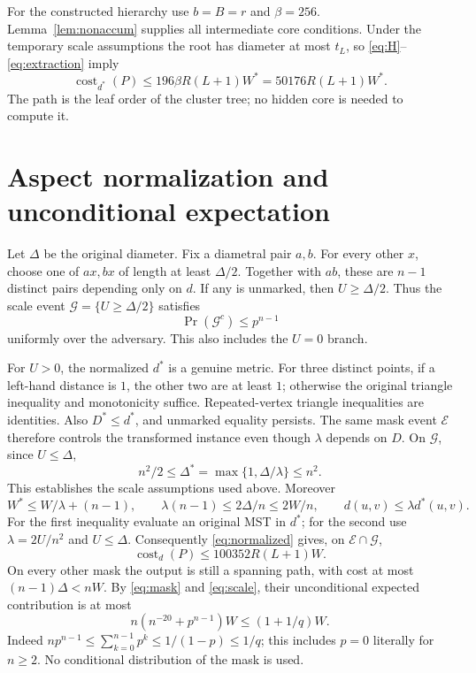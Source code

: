 \documentclass[acmsmall,11pt,nonacm]{acmart}
\theoremstyle{definition}
\newcommand{\cost}{\operatorname{cost}}
\newcommand{\calE}{\mathcal E}
\newcommand{\calG}{\mathcal G}
\begin{document}
For the constructed hierarchy use $b=B=r$ and $\beta=256$.
Lemma~\ref{lem:nonaccum} supplies all intermediate core conditions.
Under the temporary scale assumptions the root has diameter at most
$t_L$, so \eqref{eq:H}--\eqref{eq:extraction} imply
\begin{equation}\label{eq:normalized}
 \cost_{d^*}(P)\leq196\beta R(L+1)W^*
                  =50176R(L+1)W^*.
\end{equation}
The path is the leaf order of the cluster tree; no hidden core is needed
to compute it.

\section{Aspect normalization and unconditional expectation}\label{sec:expectation}

Let $\Delta$ be the original diameter. Fix a diametral pair $a,b$.
For every other $x$, choose one of $ax,bx$ of length at least $\Delta/2$.
Together with $ab$, these are $n-1$ distinct pairs depending only on $d$.
If any is unmarked, then $U\geq\Delta/2$. Thus the scale event
$\calG=\{U\geq\Delta/2\}$ satisfies
\begin{equation}\label{eq:scale}
 \Pr(\calG^c)\leq p^{n-1}
\end{equation}
uniformly over the adversary. This also includes the $U=0$ branch.

For $U>0$, the normalized $d^*$ is a genuine metric. For three distinct
points, if a left-hand distance is $1$, the other two are at least $1$;
otherwise the original triangle inequality and monotonicity suffice.
Repeated-vertex triangle inequalities are identities. Also $D^*\leq d^*$,
and unmarked equality persists. The same mask event $\calE$ therefore
controls the transformed instance even though $\lambda$ depends on $D$.
On $\calG$, since $U\leq\Delta$,
\[
 n^2/2\leq\Delta^*=\max\{1,\Delta/\lambda\}\leq n^2.
\]
This establishes the scale assumptions used above. Moreover
\[
 W^*\leq W/\lambda+(n-1),\qquad
 \lambda(n-1)\leq2\Delta/n\leq2W/n,\qquad
 d(u,v)\leq\lambda d^*(u,v).
\]
For the first inequality evaluate an original MST in $d^*$; for the
second use $\lambda=2U/n^2$ and $U\leq\Delta$.
Consequently \eqref{eq:normalized} gives, on $\calE\cap\calG$,
\[
 \cost_d(P)\leq100352R(L+1)W.
\]
On every other mask the output is still a spanning path, with cost
at most $(n-1)\Delta<nW$. By \eqref{eq:mask} and \eqref{eq:scale},
their unconditional expected contribution is at most
\[
 n(n^{-20}+p^{n-1})W\leq(1+1/q)W.
\]
Indeed $np^{n-1}\leq\sum_{k=0}^{n-1}p^k\leq1/(1-p)\leq1/q$;
this includes $p=0$ literally for $n\geq2$. No conditional distribution
of the mask is used.
\end{document}
